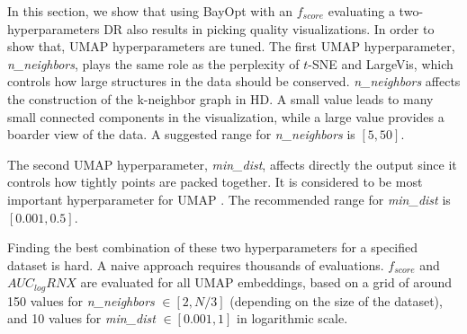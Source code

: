In this section, we show that using BayOpt with an $f_{score}$ evaluating a two-hyperparameters DR also results in picking quality visualizations. In order to show that, UMAP hyperparameters are tuned. The first UMAP hyperparameter, \emph{n\_neighbors}, plays the same role as the perplexity of $t$-SNE and LargeVis, which controls how large structures in the data should be conserved.
\emph{n\_neighbors} affects the construction of the k-neighbor graph in HD.
A small value leads to many small connected components in the visualization, while a large value provides a boarder view of the data.
A suggested range for \emph{n\_neighbors} is $[5, 50]$.

The second UMAP hyperparameter, \emph{min\_dist}, affects directly the output since it controls how tightly points are packed together. It is considered to be most important hyperparameter for UMAP \cite{mcinnes2018umap}.
The recommended range for \emph{min\_dist} is $[0.001, 0.5]$.

Finding the best combination of these two hyperparameters for a specified dataset is hard.
A naive approach requires thousands of evaluations.
$f_{score}$ and $AUC_{log}RNX$ are evaluated for all UMAP embeddings, based on a grid of around 150 values for \emph{n\_neighbors} $\in [2, N/3]$ (depending on the size of the dataset), and 10 values for \emph{min\_dist} $\in [0.001, 1]$ in logarithmic scale.

